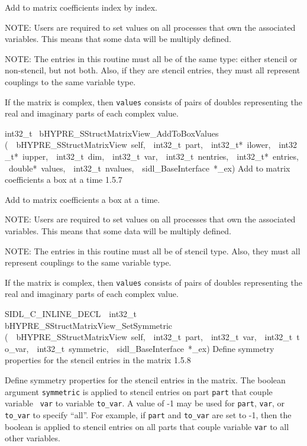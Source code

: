 \documentclass{article}
\begin{document}
\begin{cxxentry}
\begin{cxxentry}
\begin{cxxfunction}
\begin{cxxdoc}
Add to matrix coefficients index by index.

NOTE: Users are required to set values on all processes that
own the associated variables.  This means that some data will
be multiply defined.

NOTE: The entries in this routine must all be of the same
type: either stencil or non-stencil, but not both.  Also, if
they are stencil entries, they must all represent couplings
to the same variable type.

If the matrix is complex, then {\tt values} consists of pairs
of doubles representing the real and imaginary parts of each
complex value.
\end{cxxdoc}
\end{cxxfunction}
\begin{cxxfunction}
{int32\_t\ }
        {bHYPRE\_SStructMatrixView\_AddToBoxValues}
        {(\ \ bHYPRE\_SStructMatrixView\ self,\ \ int32\_t\ part,\ \ int32\_t*\ ilower,\ \ int32\_t*\ iupper,\ \ int32\_t\ dim,\ \ int32\_t\ var,\ \ int32\_t\ nentries,\ \ int32\_t*\ entries,\ \ double*\ values,\ \ int32\_t\ nvalues,\ \ sidl\_BaseInterface\ *\_ex)}
        {
Add to matrix coefficients a box at a time}
        {1.5.7}
\begin{cxxdoc}

Add to matrix coefficients a box at a time.

NOTE: Users are required to set values on all processes that
own the associated variables.  This means that some data will
be multiply defined.

NOTE: The entries in this routine must all be of stencil
type.  Also, they must all represent couplings to the same
variable type.

If the matrix is complex, then {\tt values} consists of pairs
of doubles representing the real and imaginary parts of each
complex value.
\end{cxxdoc}
\end{cxxfunction}
\begin{cxxfunction}
{SIDL\_C\_INLINE\_DECL\ \ int32\_t\ }
        {bHYPRE\_SStructMatrixView\_SetSymmetric}
        {(\ \ bHYPRE\_SStructMatrixView\ self,\ \ int32\_t\ part,\ \ int32\_t\ var,\ \ int32\_t\ to\_var,\ \ int32\_t\ symmetric,\ \ sidl\_BaseInterface\ *\_ex)}
        {
Define symmetry properties for the stencil entries in the
matrix}
        {1.5.8}
\begin{cxxdoc}

Define symmetry properties for the stencil entries in the
matrix.  The boolean argument {\tt symmetric} is applied to
stencil entries on part {\tt part} that couple variable {\tt
var} to variable {\tt to\_var}.  A value of -1 may be used
for {\tt part}, {\tt var}, or {\tt to\_var} to specify
``all''.  For example, if {\tt part} and {\tt to\_var} are
set to -1, then the boolean is applied to stencil entries on
all parts that couple variable {\tt var} to all other
variables.


\end{cxxdoc}
\end{cxxfunction}
\end{cxxentry}
\end{cxxentry}
\end{document}
